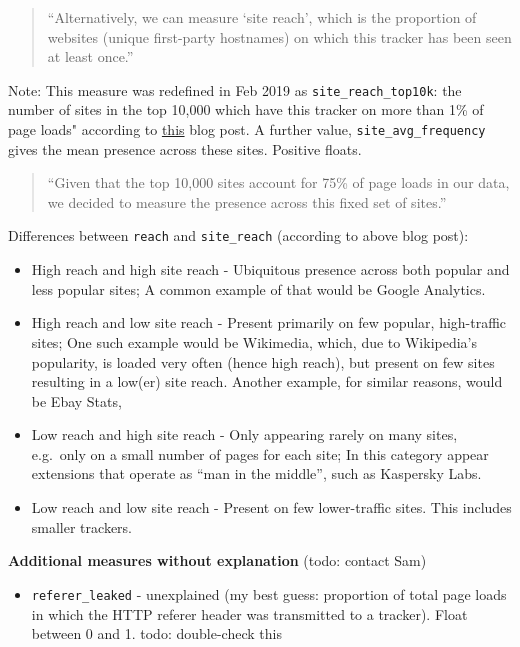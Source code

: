 \documentclass[
]{article}
\providecommand{\tightlist}{%
  \setlength{\itemsep}{0pt}\setlength{\parskip}{0pt}}
\begin{document}
\begin{quote}
``Alternatively, we can measure `site reach', which is the proportion of
websites (unique first-party hostnames) on which this tracker has been
seen at least once.''
\end{quote}

Note: This measure was redefined in Feb 2019 as
\texttt{site\_reach\_top10k}: the number of sites in the top 10,000
which have this tracker on more than 1\% of page loads" according to
\href{https://t.ly/Ra6z}{this} blog post. A further value,
\texttt{site\_avg\_frequency} gives the mean presence across these
sites. Positive floats.

\begin{quote}
``Given that the top 10,000 sites account for 75\% of page loads in our
data, we decided to measure the presence across this fixed set of
sites.''
\end{quote}

Differences between \texttt{reach} and \texttt{site\_reach} (according
to above blog post):

\begin{itemize}
\tightlist
\item
  High reach and high site reach - Ubiquitous presence across both
  popular and less popular sites; A common example of that would be
  Google Analytics.
\item
  High reach and low site reach - Present primarily on few popular,
  high-traffic sites; One such example would be Wikimedia, which, due to
  Wikipedia's popularity, is loaded very often (hence high reach), but
  present on few sites resulting in a low(er) site reach. Another
  example, for similar reasons, would be Ebay Stats,
\item
  Low reach and high site reach - Only appearing rarely on many sites,
  e.g.~only on a small number of pages for each site; In this category
  appear extensions that operate as ``man in the middle'', such as
  Kaspersky Labs.
\item
  Low reach and low site reach - Present on few lower-traffic sites.
  This includes smaller trackers.
\end{itemize}

\textbf{Additional measures without explanation} (todo: contact Sam)

\begin{itemize}
\tightlist
\item
  \texttt{referer\_leaked} - unexplained (my best guess: proportion of
  total page loads in which the HTTP referer header was transmitted to a
  tracker). Float between 0 and 1. todo: double-check this
\end{itemize}
\end{document}
